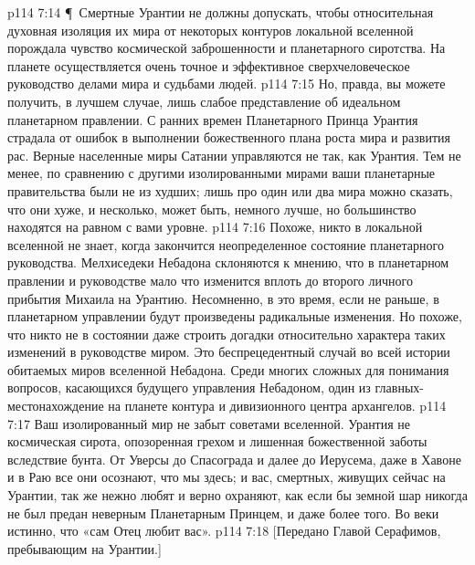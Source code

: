 \vs p114 7:14 \P\ Смертные Урантии не должны допускать, чтобы относительная духовная изоляция их мира от некоторых контуров локальной вселенной порождала чувство космической заброшенности и планетарного сиротства. На планете осуществляется очень точное и эффективное сверхчеловеческое руководство делами мира и судьбами людей.
\vs p114 7:15 Но, правда, вы можете получить, в лучшем случае, лишь слабое представление об идеальном планетарном правлении. С ранних времен Планетарного Принца Урантия страдала от ошибок в выполнении божественного плана роста мира и развития рас. Верные населенные миры Сатании управляются не так, как Урантия. Тем не менее, по сравнению с другими изолированными мирами ваши планетарные правительства были не из худших; лишь про один или два мира можно сказать, что они хуже, и несколько, может быть, немного лучше, но большинство находятся на равном с вами уровне.
\vs p114 7:16 Похоже, никто в локальной вселенной не знает, когда закончится неопределенное состояние планетарного руководства. Мелхиседеки Небадона склоняются к мнению, что в планетарном правлении и руководстве мало что изменится вплоть до второго личного прибытия Михаила на Урантию. Несомненно, в это время, если не раньше, в планетарном управлении будут произведены радикальные изменения. Но похоже, что никто не в состоянии даже строить догадки относительно характера таких изменений в руководстве миром. Это беспрецедентный случай во всей истории обитаемых миров вселенной Небадона. Среди многих сложных для понимания вопросов, касающихся будущего управления Небадоном, один из главных\hyp{}местонахождение на планете контура и дивизионного центра архангелов.
\vs p114 7:17 Ваш изолированный мир не забыт советами вселенной. Урантия не космическая сирота, опозоренная грехом и лишенная божественной заботы вследствие бунта. От Уверсы до Спасограда и далее до Иерусема, даже в Хавоне и в Раю все они осознают, что мы здесь; и вас, смертных, живущих сейчас на Урантии, так же нежно любят и верно охраняют, как если бы земной шар никогда не был предан неверным Планетарным Принцем, и даже более того. Во веки истинно, что «сам Отец любит вас».
\vs p114 7:18 [Передано Главой Серафимов, пребывающим на Урантии.]
